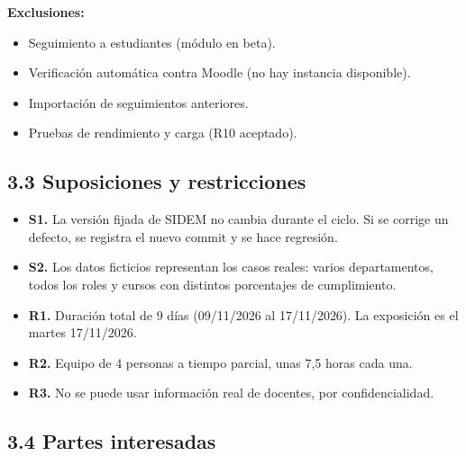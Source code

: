 \documentclass[11pt,a4paper,oneside]{report}
\begin{document}
\textbf{Exclusiones:}


\begin{itemize}
\item Seguimiento a estudiantes (módulo en beta).
\item Verificación automática contra Moodle (no hay instancia disponible).
\item Importación de seguimientos anteriores.
\item Pruebas de rendimiento y carga (R10 aceptado).
\end{itemize}

\subsection*{3.3 Suposiciones y restricciones}

\begin{itemize}
\item \textbf{S1.} La versión fijada de SIDEM no cambia durante el ciclo. Si se corrige un defecto, se registra el nuevo commit y se hace regresión.
\item \textbf{S2.} Los datos ficticios representan los casos reales: varios departamentos, todos los roles y cursos con distintos porcentajes de cumplimiento.
\item \textbf{R1.} Duración total de 9 días (09/11/2026 al 17/11/2026). La exposición es el martes 17/11/2026.
\item \textbf{R2.} Equipo de 4 personas a tiempo parcial, unas 7,5 horas cada una.
\item \textbf{R3.} No se puede usar información real de docentes, por confidencialidad.
\end{itemize}

\Needspace{214pt}\subsection*{3.4 Partes interesadas}
\end{document}
